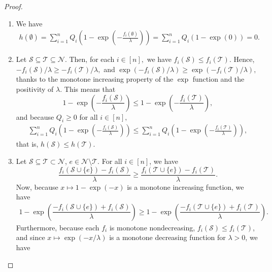 \documentclass[letter,11pt]{article}
\def\lp{\left(}
\def\rp{\right)}
\def\sS{\mathcal{S}}
\def\sN{\mathcal{N}}
\begin{document}
\begin{proof}
\begin{enumerate}[label=\bfseries(\roman*), leftmargin=*, itemsep=2pt]
\item We have
\begin{equation}
\begin{split}
h(\emptyset) = \sum_{i=1}^nQ_i\lp1-\exp{\lp-\frac{f_i(\emptyset)}{\lambda}\rp}\rp 
= \sum_{i=1}^nQ_i\lp1-\exp{\lp0\rp}\rp = 0.
\end{split}
\end{equation}
\item Let $\sS \subseteq \mathcal{T} \subseteq \sN$. Then, for each $i \in [n],$ we have $f_i(\sS) \leq f_i(\mathcal{T}).$ Hence, $-f_i(\sS)/\lambda \geq - f_i(\mathcal{T})/\lambda,$ and $\exp(-f_i(\sS)/\lambda) \geq \exp(-f_i(\mathcal{T})/\lambda),$ thanks to the monotone increasing property of the $\exp$ function and the positivity of $\lambda$. This means that 
\begin{equation}
1-\exp\lp -\frac{f_i(\sS)}{\lambda}\rp \leq  1-\exp\lp -\frac{f_i(\mathcal{T})}{\lambda}\rp,
\end{equation}
and because $Q_i \geq 0$ for all $i \in [n],$ 
\begin{equation}
\begin{split}
\sum_{i=1}^nQ_i\lp1-\exp\lp -\frac{f_i(\sS)}{\lambda}\rp \rp \leq \sum_{i=1}^nQ_i\lp1-\exp\lp -\frac{f_i(\mathcal{T})}{\lambda}\rp\rp,
\end{split}
\end{equation}
that is, $h(\sS) \leq h(\mathcal{T})$.
\item Let $\sS \subseteq \mathcal{T} \subset \sN$, $e \in \sN \setminus \mathcal{T}$. For all $i \in [n]$, we have
\begin{equation}
\dfrac{f_i(\sS \cup \{e\}) - f_i(\sS)}{\lambda} \geq \dfrac{f_i(\mathcal{T} \cup \{e\}) - f_i(\mathcal{T})}{\lambda}.
\end{equation}
Now, because $x\mapsto 1-\exp(-x)$ is a monotone increasing function, we have
\begin{equation}\label{eq:multiplythis}
\begin{split}
1-\exp\lp\dfrac{-f_i(\sS \cup \{e\}) + f_i(\sS)}{\lambda}\rp \geq 1-\exp\lp\dfrac{-f_i(\mathcal{T} \cup \{e\}) + f_i(\mathcal{T})}{\lambda} \rp.
\end{split}
\end{equation}
Furthermore, because each $f_i$ is monotone nondecreasing, $f_i(\sS) \leq f_i(\mathcal{T})$, and since $x\mapsto \exp(-x/\lambda)$ is a monotone decreasing function for $\lambda > 0$, we have

\end{enumerate}
\end{proof}
\end{document}
